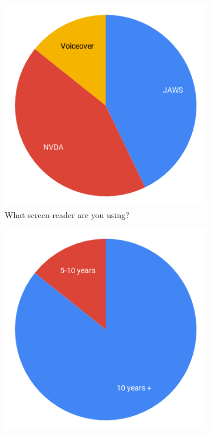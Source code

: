 \documentclass[ %
                    author={Aleena Baig},
                supervisor={Dr Simon Lock},
                    degree={BSc},
                     title={On Making Web Accessible Graphs},
                  subtitle={},
                      year={2019} ]{dissertation}
\begin{document}
\begin{figure}[h]
  \centering
  \begin{subfigure}[b]{0.3\linewidth}
    \centering
    \includegraphics[width=\linewidth]{images/ScreenReader.png}
     \caption{What screen-reader are you using?}
  \end{subfigure}
  \begin{subfigure}[b]{0.3\linewidth}
    \centering
    \includegraphics[width=\linewidth]{images/HowLongUsingScreenReader.png}

\end{subfigure}
\end{figure}
\end{document}

